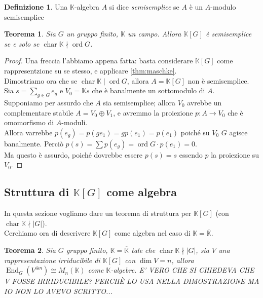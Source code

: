 \documentclass[11pt]{article}
\theoremstyle{plain}
\newtheorem{thm}{Teorema}[section]
\theoremstyle{definition}
\newtheorem{defn}{Definizione}[section]
\theoremstyle{remark}
\newcommand{\K}{\mathbb{K}}
\DeclareMathOperator{\End}{End}
\DeclareMathOperator{\Char}{char}
\DeclareMathOperator{\ord}{ord}
\begin{document}
   \begin{defn}
    Una $\K$-algebra $A$ si dice \emph{semisemplice} se $A$ è un $A$-modulo semisemplice
   \end{defn}
   \begin{thm}
    Sia $G$ un gruppo finito, $\K$ un campo. Allora $\K[G]$ è semisemplice se e solo se $\Char\K\nmid\ord G$.
   \end{thm}
   \begin{proof}
    Una freccia l'abbiamo appena fatta: basta considerare $\K[G]$ come rappresentzione su se stesso, e applicare \ref{thm:maschke}.\\
    Dimostriamo ora che se $\Char\K\mid\ord G$, allora $A=\K[G]$ non è semisemplice.
    Sia $s=\sum_{g\in G}e_g$ e $V_0=\K s$ che è banalmente un sottomodulo di $A$.\\
    Supponiamo per assurdo che $A$ sia semisemplice; allora $V_0$ avrebbe un complementare stabile $A=V_0\oplus V_1$, e avremmo la proiezione $p:A\to V_0$ che è omomorfismo di $A$-moduli.\\
    Allora varrebbe $p(e_g)=p(ge_1)=gp(e_1)=p(e_1)$ poiché su $V_0$ $G$ agisce banalmente. Perciò $p(s)=\sum p(e_g)=\ord G\cdot p(e_1)=0$.\\
    Ma questo è assurdo, poiché dovrebbe essere $p(s)=s$ essendo $p$ la proiezione su $V_0$.
    
   \end{proof}




\subsection{Struttura di $\K[G]$ come algebra}
In questa sezione vogliamo dare un teorema di struttura per $\K[G]$ (con $\Char \K  \nmid |G|$).\\
Cerchiamo ora di descrivere $\K[G]$ come algebra nel caso di $\K=\overline{\K}$.
\begin{thm}\label{thm:end_matrici}
	Sia $G$ gruppo finito, $\K=\overline{\K}$ tale che $\Char \K \nmid |G|$, sia $V$ una rappresentazione irriducibile di $\K[G]$ con $\dim V = n$, allora $\End_G(V^{\oplus n}) \cong M_n(\K)$ come $\K$-algebre.
	E' VERO CHE SI CHIEDEVA CHE V FOSSE IRRIDUCIBILE? PERCHÈ LO USA NELLA DIMOSTRAZIONE MA IO NON LO AVEVO SCRITTO...
\end{thm}
\end{document}
